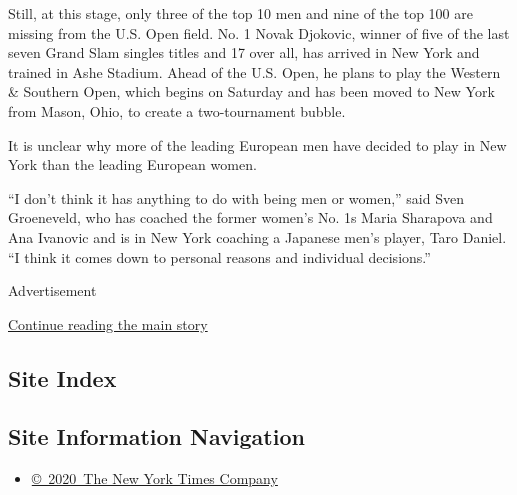 Still, at this stage, only three of the top 10 men and nine of the top
100 are missing from the U.S. Open field. No. 1 Novak Djokovic, winner
of five of the last seven Grand Slam singles titles and 17 over all, has
arrived in New York and trained in Ashe Stadium. Ahead of the U.S. Open,
he plans to play the Western \& Southern Open, which begins on Saturday
and has been moved to New York from Mason, Ohio, to create a
two-tournament bubble.

It is unclear why more of the leading European men have decided to play
in New York than the leading European women.

``I don't think it has anything to do with being men or women,'' said
Sven Groeneveld, who has coached the former women's No. 1s Maria
Sharapova and Ana Ivanovic and is in New York coaching a Japanese men's
player, Taro Daniel. ``I think it comes down to personal reasons and
individual decisions.''

Advertisement

\protect\hyperlink{after-bottom}{Continue reading the main story}

\hypertarget{site-index}{%
\subsection{Site Index}\label{site-index}}

\hypertarget{site-information-navigation}{%
\subsection{Site Information
Navigation}\label{site-information-navigation}}

\begin{itemize}
\tightlist
\item
  \href{https://help.nytimes3xbfgragh.onion/hc/en-us/articles/115014792127-Copyright-notice}{©~2020~The
  New York Times Company}
\end{itemize}

